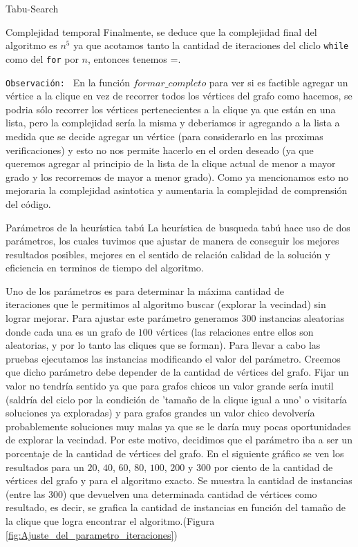 \begin{section}{Tabu-Search}
\begin{subsection}{Complejidad temporal}
			 Finalmente, se deduce que la complejidad final del algoritmo es $n^5$ ya que acotamos tanto la cantidad de iteraciones del cliclo \texttt{while} como del \texttt{for} por $n$, entonces tenemos =.\Pa
			 
			 \texttt{Observación: } En la función $formar\_completo$ para ver si es factible agregar un vértice a la clique en vez de recorrer todos los vértices del grafo como hacemos, se podria sólo recorrer los vértices pertenecientes a la clique ya que están en una lista, pero la complejidad sería la misma y deberiamos ir agregando a la lista a medida que se decide agregar un vértice (para considerarlo en las proximas verificaciones) y esto no nos permite hacerlo en el orden deseado (ya que queremos agregar al principio de la lista de la clique actual de menor a mayor grado y los recorremos de mayor a menor grado). Como ya mencionamos esto no mejoraria la complejidad asintotica y aumentaria la complejidad de comprensión del código.
	\end{subsection}

	\begin{subsection}{Parámetros de la heurística tabú}
		La heurística de busqueda tabú hace uso de dos parámetros, los cuales tuvimos que ajustar de manera de conseguir los mejores resultados posibles, mejores en el sentido de relación calidad de la solución y eficiencia en terminos de tiempo del algoritmo.

		Uno de los parámetros es para determinar la máxima cantidad de\\ iteraciones que le permitimos al algoritmo buscar (explorar la vecindad) sin lograr mejorar. Para ajustar este parámetro generamos $300$ instancias aleatorias donde cada una es un grafo de $100$ vértices (las relaciones entre ellos son aleatorias, y por lo tanto las cliques que se forman). Para llevar a cabo las pruebas ejecutamos las instancias modificando el valor del parámetro. Creemos que dicho parámetro debe depender de la cantidad de vértices del grafo. Fijar un valor no tendría sentido ya que para grafos chicos un valor grande sería inutil (saldría del ciclo por la condición de 'tamaño de la clique igual a uno' o visitaría soluciones ya exploradas) y para grafos grandes un valor chico devolvería probablemente soluciones muy malas ya que se le daría muy pocas oportunidades de explorar la vecindad. Por este motivo, decidimos que el parámetro iba a ser un porcentaje de la cantidad de vértices del grafo. En el siguiente gráfico se ven los resultados para un $20$, $40$, $60$, $80$, $100$, $200$ y $300$ por ciento de la cantidad de vértices del grafo y para el algoritmo exacto. Se muestra la cantidad de instancias (entre las $300$) que devuelven una determinada cantidad de vértices como resultado, es decir, se grafica la cantidad de instancias en función del tamaño de la clique que logra encontrar el algoritmo.(Figura \ref{fig:Ajuste_del_parametro_iteraciones})


\end{subsection}
\end{section}

